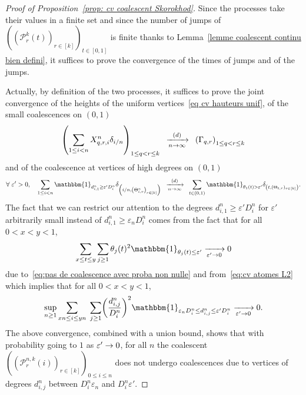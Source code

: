 \documentclass[10pt]{amsart}
\theoremstyle{definition}\newtheorem{defi}[theo]{Definition}\newtheorem{rema}[theo]{Remark}\newtheorem{exam}[theo]{Example}\newtheorem{exem}[theo]{Example}\newtheorem{nota}[theo]{Notation}
\newcommand{\e}{\varepsilon}
\newcommand{\cvloi}[1][n]{\enskip\xrightarrow[#1 \to \infty]{(d)}\enskip}
\newcommand{\1}{\mathbbm{1}}
\newcommand{\Part}{\mathcal{P}}
\let\originalleft\left
\let\originalright\right
\renewcommand{\left}{\mathopen{}\mathclose\bgroup\originalleft}
\renewcommand{\right}{\aftergroup\egroup\originalright}
\renewcommand*{\to}{\mathchoice{\longrightarrow}{\rightarrow}{\rightarrow}{\rightarrow}}
\let\oldforall\forall
\renewcommand*{\forall}{\mathrel{\oldforall}}
\begin{document}
\begin{proof}[Proof of Proposition~\ref{prop: cv coalescent Skorokhod}]
Since the processes take their values in a finite set and since the number of jumps of $((\Part^k_r(t))_{r \in [k]})_{t \in [0,1]}$ is finite {thanks to Lemma~\ref{lemme coalescent continu bien defini}}, it suffices to prove the convergence of the times of jumps and of the jumps.

Actually, by definition of the two processes, it suffices to prove the joint convergence of the heights of the uniform vertices~\eqref{eq cv hauteurs unif}, of the small coalescences on $(0,1)$
\begin{equation}\label{eq cv petites coalescences}
\left(\sum_{ 1\le i < n}X^n_{q,r,i} \delta_{i/n}\right)_{1 \le q<r \le k}\cvloi[n] \left(\Gamma_{q,r}\right)_{1 \le q<r\le k}
\end{equation}
and of the coalescence at vertices of high degrees on $(0,1)$
\begin{equation}\label{eq cv grandes coalescences}
\forall \e' >0,\quad \sum_{1\le i < n} \1_{d^n_{i,1} \ge \e' D^n_i} \delta_{\left(i/n, \left(\Theta^n_{i,r}\right)_{r\in [k]}\right)}\cvloi[n] \sum_{t \in (0,1)} \1_{\theta_1(t)>\e'} \delta_{\left(t,(\Theta_{t,r})_{r \in [k]}\right)}.
\end{equation}
The fact that we can restrict our attention to the degrees $d^n_{i,1} \ge \e' D^n_i$ for $\e'$ arbitrarily small instead of $d^n_{i,1} \ge \e_n D^n_i$ comes from the fact that for all $0<x<y<1$,
\[
\sum_{x\le t\le y} \sum_{j\ge 1} \theta_j(t)^2 \1_{\theta_j(t)\le \e'} \xrightarrow[\e' \to 0]{} 0
\]
due to~\eqref{eq:pas de coalescence avec proba non nulle} and from~\eqref{eq:cv atomes L2} which implies that for all $0<x<y<1$,
\[
\sup_{n\ge 1} \sum_{xn \le i \le yn}\; \sum_{j\ge 1} \left(\frac{d^n_{i,j}}{D^n_i}\right)^2 \1_{\e_n D^n_i \le d^n_{i,j} \le \e' D^n_i} \xrightarrow[\e' \to 0]{} 0.
\]
The above convergence, combined with a union bound, shows that with probability going to $1$ as $\e'\to 0$, for all $n$ the coalescent $((\Part^{n,k}_r(i))_{r \in [k]})_{0\le i \le n}$ does not undergo coalescences due to vertices of degrees $d^n_{i,j}$ between $D^n_i\e_n$ and $D^n_i \e'$.



\end{proof}
\end{document}
